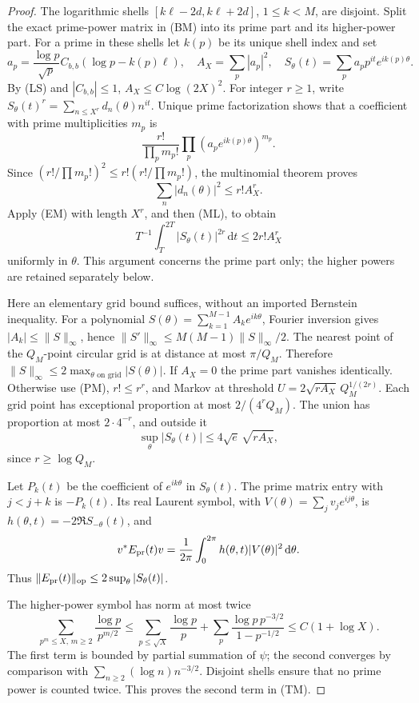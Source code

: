 \documentclass[11pt]{article}
\theoremstyle{remark}\newtheorem{remark}[theorem]{Remark}
\newcommand{\dd}{\,\mathrm d}
\begin{document}
\begin{proof}
The logarithmic shells $[k\ell-2d,k\ell+2d]$, $1\le k<M$,
are disjoint. Split the exact prime-power matrix in (BM) into
its prime part and its higher-power part. For a prime in these
shells let $k(p)$ be its unique shell index and set
\[
 a_p=\frac{\log p}{\sqrt p}C_{b,b}(\log p-k(p)\ell),\quad
 A_X=\sum_p|a_p|^2,\quad
 S_\theta(t)=\sum_p a_pp^{it}e^{ik(p)\theta}.
\]
By (LS) and $|C_{b,b}|\le1$, $A_X\le C\log(2X)^2$.
For integer $r\ge1$, write
$S_\theta(t)^r=\sum_{n\le X^r}d_n(\theta)n^{it}$.
Unique prime factorization shows that a coefficient with
prime multiplicities $m_p$ is
\[
 \frac{r!}{\prod_p m_p!}\prod_p(a_pe^{ik(p)\theta})^{m_p}.
\]
Since $(r!/\prod m_p!)^2\le r!(r!/\prod m_p!)$, the
multinomial theorem proves
\[
 \sum_n|d_n(\theta)|^2\le r!A_X^r.
\]
Apply (EM) with length $X^r$, and then (ML), to obtain
\[
 T^{-1}\int_T^{2T}|S_\theta(t)|^{2r}\dd t\le2r!A_X^r
                                                          \tag{PM}
\]
uniformly in $\theta$. This argument concerns the prime part
only; the higher powers are retained separately below.

Here an elementary grid bound suffices, without an imported
Bernstein inequality. For a polynomial
$S(\theta)=\sum_{k=1}^{M-1}A_ke^{ik\theta}$, Fourier inversion
gives $|A_k|\le\|S\|_\infty$, hence
$\|S'\|_\infty\le M(M-1)\|S\|_\infty/2$.
The nearest point of the $Q_M$-point circular grid is at
distance at most $\pi/Q_M$. Therefore
$\|S\|_\infty\le2\max_{\theta\text{ on grid}}|S(\theta)|$.
If $A_X=0$ the prime part vanishes identically. Otherwise use (PM),
$r!\le r^r$, and Markov at threshold
$U=2\sqrt{rA_X}\,Q_M^{1/(2r)}$.
Each grid point has exceptional proportion at most
$2/(4^rQ_M)$. The union has proportion at most $2\cdot4^{-r}$,
and outside it
\[
 \sup_\theta|S_\theta(t)|\le4\sqrt e\,\sqrt{rA_X},
\]
since $r\ge\log Q_M$.

Let $P_k(t)$ be the coefficient of $e^{ik\theta}$ in $S_\theta(t)$.
The prime matrix entry with $j<j+k$ is $-P_k(t)$.
Its real Laurent symbol, with
$V(\theta)=\sum_jv_je^{ij\theta}$, is
$h(\theta,t)=-2\Re S_{-\theta}(t)$, and
\[
 v^*E_{\rm pr}(t)v
 =\frac1{2\pi}\int_0^{2\pi}h(\theta,t)|V(\theta)|^2\dd\theta.
\]
Thus $\|E_{\rm pr}(t)\|_{\rm op}\le2\sup_\theta|S_\theta(t)|$.

The higher-power symbol has norm at most twice
\[
 \sum_{p^m\le X,\,m\ge2}\frac{\log p}{p^{m/2}}
 \le \sum_{p\le\sqrt X}\frac{\log p}{p}
       +\sum_p\frac{\log p\,p^{-3/2}}{1-p^{-1/2}}
 \le C(1+\log X).
\]
The first term is bounded by partial summation of $\psi$;
the second converges by comparison with
$\sum_{n\ge2}(\log n)n^{-3/2}$.
Disjoint shells ensure that no prime power is counted twice.
This proves the second term in (TM).


\end{proof}
\end{document}
